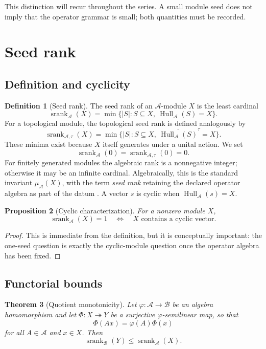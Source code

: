 \documentclass[11pt]{article}
\newtheorem{theorem}{Theorem}[section]
\newtheorem{proposition}[theorem]{Proposition}
\theoremstyle{definition}
\newtheorem{definition}[theorem]{Definition}
\theoremstyle{remark}
\newcommand{\cA}{\mathcal A}
\newcommand{\cB}{\mathcal B}
\newcommand{\Hull}{\operatorname{Hull}}
\newcommand{\srank}{\operatorname{srank}}
\newcommand{\closure}[1]{\overline{#1}}
\begin{document}
This distinction will recur throughout the series. A small module seed does not imply that the operator grammar is small; both quantities must be recorded.

\section{Seed rank}

\subsection{Definition and cyclicity}

\begin{definition}[Seed rank]
The seed rank of an $\cA$-module $X$ is the least cardinal
\[
\boxed{
\srank_{\cA}(X)
=
\min\bigl\{|S|:S\subseteq X,\ \Hull_{\cA}(S)=X\bigr\}.
}
\]
For a topological module, the topological seed rank is defined analogously by
\[
\srank_{\cA,\tau}(X)
=
\min\bigl\{|S|:S\subseteq X,\ \closure{\Hull_{\cA}(S)}^{\tau}=X\bigr\}.
\]
These minima exist because $X$ itself generates under a unital action. We set
\[
\srank_{\cA}(0)=\srank_{\cA,\tau}(0)=0.
\]
For finitely generated modules the algebraic rank is a nonnegative integer; otherwise it may be an infinite cardinal. Algebraically, this is the standard invariant $\mu_{\cA}(X)$, with the term \emph{seed rank} retaining the declared operator algebra as part of the datum \cite[Ch.~1]{lam1999modules}.
A vector $s$ is cyclic when $\Hull_{\cA}(s)=X$.
\end{definition}

\begin{proposition}[Cyclic characterization]
\label{prop:cyclic-characterization}
For a nonzero module $X$,
\[
\srank_{\cA}(X)=1
\quad\Longleftrightarrow\quad
X\text{ contains a cyclic vector.}
\]
\end{proposition}

\begin{proof}
This is immediate from the definition, but it is conceptually important: the one-seed question is exactly the cyclic-module question once the operator algebra has been fixed.
\end{proof}

\subsection{Functorial bounds}

\begin{theorem}[Quotient monotonicity]
\label{thm:quotient}
Let $\varphi:\cA\to\cB$ be an algebra homomorphism and let $\Phi:X\twoheadrightarrow Y$ be a surjective $\varphi$-semilinear map, so that
\[
\Phi(Ax)=\varphi(A)\Phi(x)
\]
for all $A\in\cA$ and $x\in X$. Then
\[
\boxed{
\srank_{\cB}(Y)\le \srank_{\cA}(X).
}
\]
\end{theorem}
\end{document}
